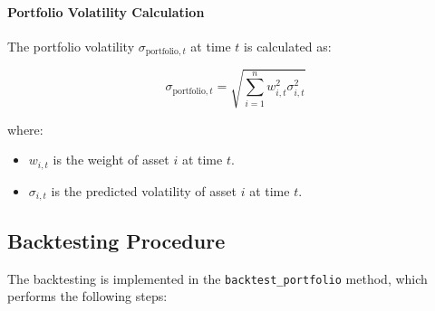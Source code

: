 \paragraph{Portfolio Volatility Calculation}

The portfolio volatility \( \sigma_{\text{portfolio}, t} \) at time \( t \) is calculated as:

\[
\sigma_{\text{portfolio}, t} = \sqrt{\sum_{i=1}^n w_{i, t}^2 \sigma_{i, t}^2}
\]

where:

\begin{itemize}
    \item \( w_{i, t} \) is the weight of asset \( i \) at time \( t \).
    \item \( \sigma_{i, t} \) is the predicted volatility of asset \( i \) at time \( t \).
\end{itemize}

\subsection{Backtesting Procedure}

The backtesting is implemented in the \texttt{backtest\_portfolio} method, which performs the following steps:

